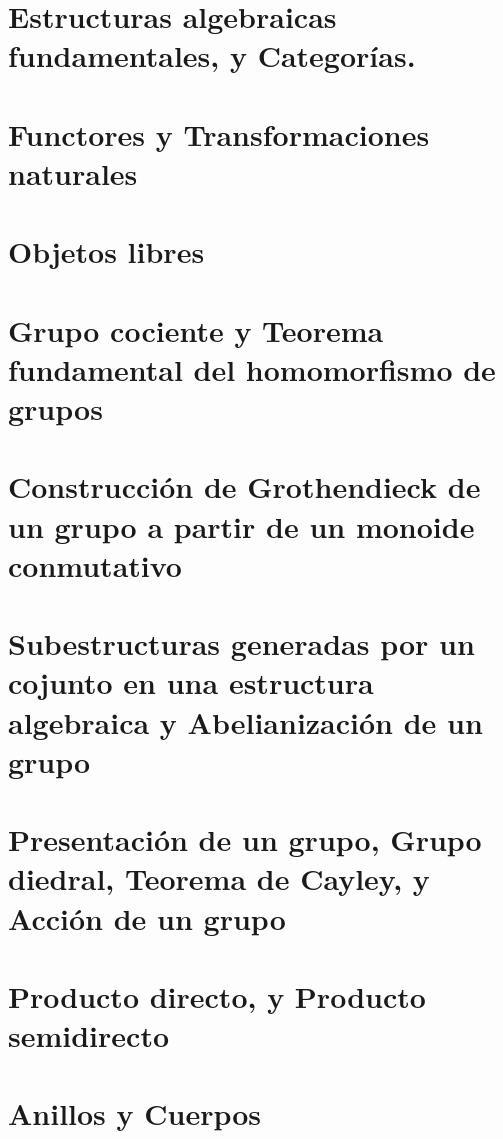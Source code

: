 \documentclass[12pt,a4paper,openany]{book} %
\begin{document}
\frontmatter
	
	\tableofcontents

	\mainmatter
	
	\chapter{Estructuras algebraicas fundamentales, y Categorías.}
	
	\chapter{Functores y Transformaciones naturales}
	
	\chapter{Objetos libres}
	
	\chapter{Grupo cociente y Teorema fundamental del homomorfismo de grupos}
	
	\chapter{Construcción de Grothendieck de un grupo a partir de un monoide conmutativo}
	
	\chapter{Subestructuras generadas por un cojunto en una estructura algebraica y Abelianización de un grupo}
	
	\chapter{Presentación de un grupo, Grupo diedral, Teorema de Cayley, y Acción de un grupo}
	
	\chapter{Producto directo, y Producto semidirecto }
	
	
	\chapter{Anillos y Cuerpos}
	
	
\end{document}
